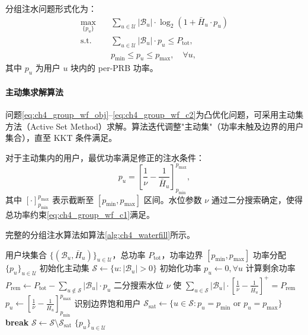 \documentclass[type=master]{fduthesis}
\begin{document}
分组注水问题形式化为：
\begin{align}
\max_{\{p_u\}} \quad & \sum_{u \in \mathcal{U}} |\mathcal{B}_u| \cdot \log_2\left(1 + \bar{H}_u \cdot p_u\right) \label{eq:ch4_group_wf_obj} \\
\text{s.t.} \quad & \sum_{u \in \mathcal{U}} |\mathcal{B}_u| \cdot p_u \leq P_{\mathrm{tot}}, \label{eq:ch4_group_wf_c1} \\
& p_{\min} \leq p_u \leq p_{\max}, \quad \forall u, \label{eq:ch4_group_wf_c2}
\end{align}
其中 $p_u$ 为用户 $u$ 块内的 per-PRB 功率。

\paragraph{主动集求解算法}
问题\eqref{eq:ch4_group_wf_obj}--\eqref{eq:ch4_group_wf_c2}为凸优化问题，可采用主动集方法（Active Set Method）求解。算法迭代调整"主动集"（功率未触及边界的用户集合），直至 KKT 条件满足。

对于主动集内的用户，最优功率满足修正的注水条件：
\begin{equation}
p_u = \left[ \frac{1}{\nu} - \frac{1}{\bar{H}_u} \right]_{p_{\min}}^{p_{\max}},
\label{eq:ch4_wf_clipped}
\end{equation}
其中 $[\cdot]_{p_{\min}}^{p_{\max}}$ 表示截断至 $[p_{\min}, p_{\max}]$ 区间。水位参数 $\nu$ 通过二分搜索确定，使得总功率约束\eqref{eq:ch4_group_wf_c1}满足。

完整的分组注水算法如算法\ref{alg:ch4_waterfill}所示。

\begin{algorithm}[t]
\caption{分组注水功率分配算法}
\label{alg:ch4_waterfill}
\begin{algorithmic}[1]
\Require 用户块集合 $\{(\mathcal{B}_u, \bar{H}_u)\}_{u \in \mathcal{U}}$，总功率 $P_{\mathrm{tot}}$，功率边界 $[p_{\min}, p_{\max}]$
\Ensure 功率分配 $\{p_u\}_{u \in \mathcal{U}}$
\State 初始化主动集 $\mathcal{S} \gets \{u : |\mathcal{B}_u| > 0\}$
\State 初始化功率 $p_u \gets 0, \forall u$
    \State 计算剩余功率 $P_{\text{rem}} \gets P_{\mathrm{tot}} - \sum_{u \notin \mathcal{S}} |\mathcal{B}_u| \cdot p_u$
    \State 二分搜索水位 $\nu$ 使 $\sum_{u \in \mathcal{S}} |\mathcal{B}_u| \cdot \left[\frac{1}{\nu} - \frac{1}{\bar{H}_u}\right]^+ = P_{\text{rem}}$
        \State $p_u \gets \left[\frac{1}{\nu} - \frac{1}{\bar{H}_u}\right]_{p_{\min}}^{p_{\max}}$
    \EndFor
    \State 识别边界饱和用户 $\mathcal{S}_{\text{sat}} \gets \{u \in \mathcal{S} : p_u = p_{\min} \text{ or } p_u = p_{\max}\}$
        \State \textbf{break} 
    \EndIf
    \State $\mathcal{S} \gets \mathcal{S} \setminus \mathcal{S}_{\text{sat}}$ 
\EndWhile
\State \Return $\{p_u\}_{u \in \mathcal{U}}$
\end{algorithmic}
\end{algorithm}
\end{document}
